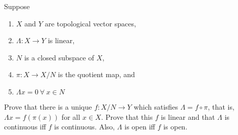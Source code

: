 Suppose
\begin{enumerate}
    \item $X$ and $Y$ are topological vector spaces,
    \item $\Lambda: X \to Y$ is linear,
    \item $N$ is a closed subspace of $X$,
    \item $\pi: X \to X/N$ is the quotient map, and
    \item $\Lambda x=0 \ \forall \ x \in N$
\end{enumerate}
Prove that there is a unique $f: X/N\to Y$ which satisfies $\Lambda=f\circ \pi$, that is, $\Lambda x=f(\pi(x))$ for all $x\in X$. Prove that this $f$ is linear and that $\Lambda$ is continuous iff $f$ is continuous. Also, $\Lambda$ is open iff $f$ is open.